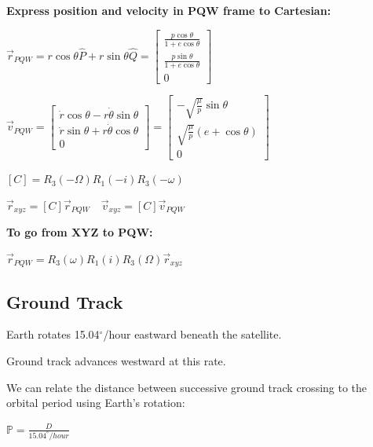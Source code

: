 \documentclass{article}
\begin{document}
\begin{multicols*}{3}
    \textbf{Express position and velocity in PQW frame to Cartesian:}\par 
    $\vec{r}_{PQW} = r\cos{\theta}\hat{P}+r\sin{\theta}\hat{Q}=
    \begin{bmatrix}
        \frac{p\cos{\theta}}{1+e\cos{\theta}}\\
        \frac{p\sin{\theta}}{1+e\cos{\theta}}\\
        0
    \end{bmatrix}
    $\par
    $\vec{v}_{PQW} =
    \begin{bmatrix}
        \dot{r}\cos{\theta}-r\dot{\theta}\sin{\theta}\\
        \dot{r}\sin{\theta}+r\dot{\theta}\cos{\theta}\\
        0
    \end{bmatrix}
    =
    \begin{bmatrix}
        -\sqrt{\frac{\mu}{p}}\sin{\theta}\\
        \sqrt{\frac{\mu}{p}}(e+\cos{\theta})\\
        0
    \end{bmatrix}
    $\par 
    $[C]=R_3(-\Omega)R_1(-i)R_3(-\omega)$\par 
    $\vec{r}_{xyz} = [C]\vec{r}_{PQW} \quad \vec{v}_{xyz}=[C]\vec{v}_{PQW}$\par 
    \textbf{To go from XYZ to PQW:}\par 
    $\vec{r}_{PQW}=R_3(\omega)R_1(i)R_3(\Omega)\vec{r}_{xyz}$

    \subsection*{Ground Track}
    Earth rotates 15.04$^\circ$/hour eastward beneath the satellite.\par 
    Ground track advances westward at this rate.\par 
    We can relate the distance between successive ground track crossing to the
    orbital period using Earth's rotation:\par 
    $\mathbb{P}=\frac{D}{15.04^\circ/hour}$

\end{multicols*}  
\end{document}
